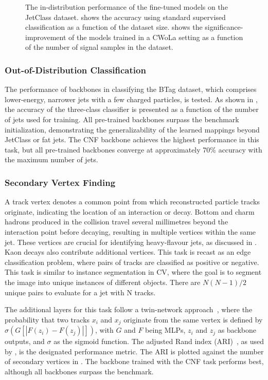 \begin{figure}[h!]
\begin{subfigure}[b]{0.4\textwidth}
        \caption{}
        \label{fig:cwola}
    \end{subfigure}
    \caption{The in-distribution performance of the fine-tuned models on the JetClass dataset.  shows the accuracy using standard supervised classification as a function of the dataset size.  shows the significance-improvement of the models trained in a CWoLa setting as a function of the number of signal samples in the dataset.}
    \label{fig:plot_A}
\end{figure}

\subsubsection{Out-of-Distribution Classification}

The performance of backbones in classifying the BTag dataset, which comprises lower-energy, narrower jets with a few charged particles, is tested.
As shown in , the accuracy of the three-class classifier is presented as a function of the number of jets used for training.
All pre-trained backbones surpass the benchmark initialization, demonstrating the generalizability of the learned mappings beyond JetClass or fat jets.
The CNF backbone achieves the highest performance in this task, but all pre-trained backbones converge at approximately 70\% accuracy with the maximum number of jets.

\subsubsection{Secondary Vertex Finding}

A track vertex denotes a common point from which reconstructed particle tracks originate, indicating the location of an interaction or decay.
Bottom and charm hadrons produced in the collision travel several millimetres beyond the interaction point before decaying, resulting in multiple vertices within the same jet.
These vertices are crucial for identifying heavy-flavour jets, as discussed in .
Kaon decays also contribute additional vertices.
This task is recast as an edge classification problem, where pairs of tracks are classified as positive or negative.
This task is similar to instance segmentation in CV, where the goal is to segment the image into unique instances of different objects.
There are $N(N-1)/2$ unique pairs to evaluate for a jet with N tracks.

The additional layers for this task follow a twin-network approach~\cite{siamese}, where the probability that two tracks $x_i$ and $x_j$ originate from the same vertex is defined by $\sigma\left(G\left[|F\left(z_i\right)-F\left(z_j\right)|\right]\right)$, with $G$ and $F$ being MLPs, $z_i$ and $z_j$ as backbone outputs, and $\sigma$ as the sigmoid function.
The adjusted Rand index (ARI)~\cite{ari}, as used by \textcite{SecondaryVertexFinding}, is the designated performance metric.
The ARI is plotted against the number of secondary vertices in .
The backbone trained with the CNF task performs best, although all backbones surpass the benchmark.

